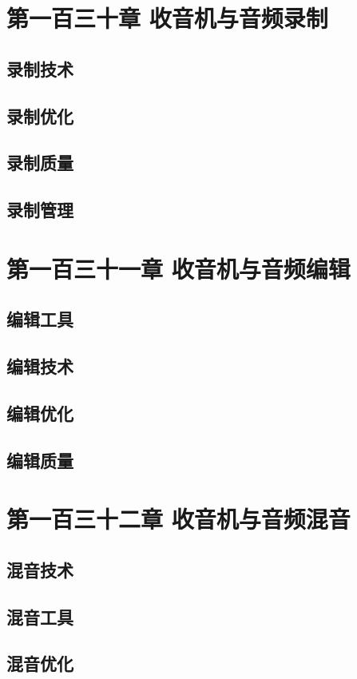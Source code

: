 \documentclass[12pt,UTF8]{ctexbook}
\begin{document}
\chapter{第一百三十章 收音机与音频录制}

\section{录制技术}
\section{录制优化}
\section{录制质量}
\section{录制管理}

\chapter{第一百三十一章 收音机与音频编辑}

\section{编辑工具}
\section{编辑技术}
\section{编辑优化}
\section{编辑质量}

\chapter{第一百三十二章 收音机与音频混音}

\section{混音技术}
\section{混音工具}
\section{混音优化}
\end{document}
